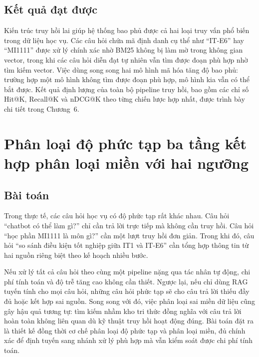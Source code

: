\documentclass[../DoAn.tex]{subfiles}
\begin{document}
\subsection{Kết quả đạt được}

Kiến trúc truy hồi lai giúp hệ thống bao phủ được cả hai loại truy vấn phổ biến
trong dữ liệu học vụ. Các câu hỏi chứa mã định danh cụ thể như ``IT-E6'' hay
``MI1111'' được xử lý chính xác nhờ BM25 không bị làm mờ trong không gian vector,
trong khi các câu hỏi diễn đạt tự nhiên vẫn tìm được đoạn phù hợp nhờ tìm kiếm
vector. Việc dùng song song hai mô hình mã hóa tăng độ bao phủ: trường hợp một
mô hình không tìm được đoạn phù hợp, mô hình kia vẫn có thể bắt được. Kết quả
định lượng của toàn bộ pipeline truy hồi, bao gồm các chỉ số Hit@K, Recall@K và
nDCG@K theo từng chiến lược hợp nhất, được trình bày chi tiết trong Chương~6.

\section{Phân loại độ phức tạp ba tầng kết hợp phân loại miền với hai ngưỡng}
\label{sec:ch5-complexity-routing}

\subsection{Bài toán}

Trong thực tế, các câu hỏi học vụ có độ phức tạp rất khác nhau. Câu hỏi
``chatbot có thể làm gì?'' chỉ cần trả lời trực tiếp mà không cần truy hồi.
Câu hỏi ``học phần MI1111 là môn gì?'' cần một lượt truy hồi đơn giản. Trong
khi đó, câu hỏi ``so sánh điều kiện tốt nghiệp giữa IT1 và IT-E6'' cần tổng
hợp thông tin từ hai nguồn riêng biệt theo kế hoạch nhiều bước.

Nếu xử lý tất cả câu hỏi theo cùng một pipeline nặng qua tác nhân tự động, chi
phí tính toán và độ trễ tăng cao không cần thiết. Ngược lại, nếu chỉ dùng RAG
tuyến tính cho mọi câu hỏi, những câu hỏi phức tạp sẽ cho câu trả lời thiếu
đầy đủ hoặc kết hợp sai nguồn. Song song với đó, việc phân loại sai miền dữ
liệu cũng gây hậu quả tương tự: tìm kiếm nhầm kho tri thức đồng nghĩa với câu
trả lời hoàn toàn không liên quan dù kỹ thuật truy hồi hoạt động đúng. Bài toán
đặt ra là thiết kế đồng thời cơ chế phân loại độ phức tạp và phân loại miền,
đủ chính xác để định tuyến sang nhánh xử lý phù hợp mà vẫn kiểm soát được chi
phí tính toán.
\end{document}
